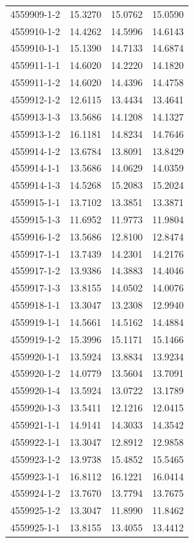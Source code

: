 \begin{longtable}{lrrr}
4559909-1-2 & 15.3270 & 15.0762 & 15.0590 \\
4559910-1-2 & 14.4262 & 14.5996 & 14.6143 \\
4559910-1-1 & 15.1390 & 14.7133 & 14.6874 \\
4559911-1-1 & 14.6020 & 14.2220 & 14.1820 \\
4559911-1-2 & 14.6020 & 14.4396 & 14.4758 \\
4559912-1-2 & 12.6115 & 13.4434 & 13.4641 \\
4559913-1-3 & 13.5686 & 14.1208 & 14.1327 \\
4559913-1-2 & 16.1181 & 14.8234 & 14.7646 \\
4559914-1-2 & 13.6784 & 13.8091 & 13.8429 \\
4559914-1-1 & 13.5686 & 14.0629 & 14.0359 \\
4559914-1-3 & 14.5268 & 15.2083 & 15.2024 \\
4559915-1-1 & 13.7102 & 13.3851 & 13.3871 \\
4559915-1-3 & 11.6952 & 11.9773 & 11.9804 \\
4559916-1-2 & 13.5686 & 12.8100 & 12.8474 \\
4559917-1-1 & 13.7439 & 14.2301 & 14.2176 \\
4559917-1-2 & 13.9386 & 14.3883 & 14.4046 \\
4559917-1-3 & 13.8155 & 14.0502 & 14.0076 \\
4559918-1-1 & 13.3047 & 13.2308 & 12.9940 \\
4559919-1-1 & 14.5661 & 14.5162 & 14.4884 \\
4559919-1-2 & 15.3996 & 15.1171 & 15.1466 \\
4559920-1-1 & 13.5924 & 13.8834 & 13.9234 \\
4559920-1-2 & 14.0779 & 13.5604 & 13.7091 \\
4559920-1-4 & 13.5924 & 13.0722 & 13.1789 \\
4559920-1-3 & 13.5411 & 12.1216 & 12.0415 \\
4559921-1-1 & 14.9141 & 14.3033 & 14.3542 \\
4559922-1-1 & 13.3047 & 12.8912 & 12.9858 \\
4559923-1-2 & 13.9738 & 15.4852 & 15.5465 \\
4559923-1-1 & 16.8112 & 16.1221 & 16.0414 \\
4559924-1-2 & 13.7670 & 13.7794 & 13.7675 \\
4559925-1-2 & 13.3047 & 11.8990 & 11.8462 \\
4559925-1-1 & 13.8155 & 13.4055 & 13.4412 \\

\end{longtable}
